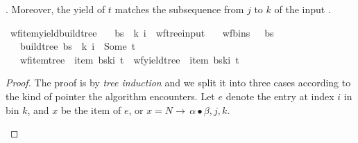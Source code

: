 \begin{isabellebody}
\begin{isamarkuptext}
\isa{{\isasymalpha}}. Moreover, the yield of $t$ matches the subsequence from $j$ to $k$ of the input \isa{{\isasymomega}}.%
\end{isamarkuptext}\isamarkuptrue%
\isamarkupfalse%
\ wf{\isacharunderscore}{\kern0pt}item{\isacharunderscore}{\kern0pt}yield{\isacharunderscore}{\kern0pt}build{\isacharunderscore}{\kern0pt}tree{\isacharprime}{\kern0pt}{\isacharcolon}{\kern0pt}\isanewline
\ \ \ {\isachardoublequoteopen}{\isacharparenleft}{\kern0pt}bs{\isacharcomma}{\kern0pt}\ {\isasymomega}{\isacharcomma}{\kern0pt}\ k{\isacharcomma}{\kern0pt}\ i{\isacharparenright}{\kern0pt}\ {\isasymin}\ wf{\isacharunderscore}{\kern0pt}tree{\isacharunderscore}{\kern0pt}input{\isachardoublequoteclose}\isanewline
\ \ \ {\isachardoublequoteopen}wf{\isacharunderscore}{\kern0pt}bins\ {\isasymG}\ {\isasymomega}\ bs{\isachardoublequoteclose}\isanewline
\ \ \ {\isachardoublequoteopen}build{\isacharunderscore}{\kern0pt}tree{\isacharprime}{\kern0pt}\ bs\ {\isasymomega}\ k\ i\ {\isacharequal}{\kern0pt}\ Some\ t{\isachardoublequoteclose}\isanewline
\ \ \ {\isachardoublequoteopen}wf{\isacharunderscore}{\kern0pt}item{\isacharunderscore}{\kern0pt}tree\ {\isasymG}\ {\isacharparenleft}{\kern0pt}item\ {\isacharparenleft}{\kern0pt}bs{\isacharbang}{\kern0pt}k{\isacharbang}{\kern0pt}i{\isacharparenright}{\kern0pt}{\isacharparenright}{\kern0pt}\ t\ {\isasymand}\ wf{\isacharunderscore}{\kern0pt}yield{\isacharunderscore}{\kern0pt}tree\ {\isasymomega}\ {\isacharparenleft}{\kern0pt}item\ {\isacharparenleft}{\kern0pt}bs{\isacharbang}{\kern0pt}k{\isacharbang}{\kern0pt}i{\isacharparenright}{\kern0pt}{\isacharparenright}{\kern0pt}\ t{\isachardoublequoteclose}%
\isadelimproof
%
\endisadelimproof
%
\isatagproof
%
\endisatagproof
{\isafoldproof}%
%
\isadelimproof
%
\endisadelimproof
%
\begin{isamarkuptext}%
\begin{proof}

The proof is by \textit{tree induction} and we split it into three cases according to the kind
of pointer the algorithm encounters. Let $e$ denote the entry at index $i$ in bin $k$, and $x$
be the item of $e$, or $x = N \rightarrow \, \alpha \bullet \beta, j, k$.

\begin{itemize}


\end{itemize}
\end{proof}
\end{isamarkuptext}
\end{isabellebody}
